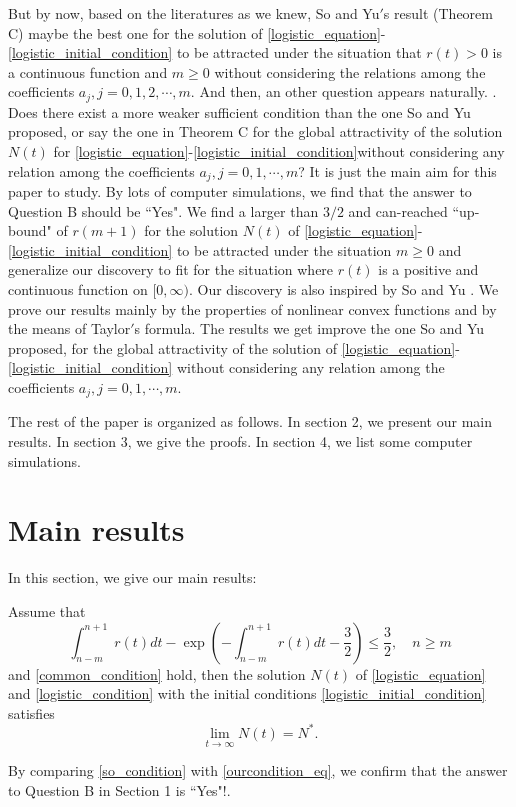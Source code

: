 \documentclass{HZNUMCM}
\begin{document}
But by now, based on the literatures as we knew, So and Yu$'$s result (Theorem C) maybe  the best one for  the solution of \eqref{logistic_equation}-\eqref{logistic_initial_condition} to be attracted under the situation that $r(t)>0$ is a continuous function and $m\geqslant 0$ without considering the relations among the coefficients  $a_j,j=0,1,2,\cdots,m$.  And then, an other question appears naturally.
 \vskip 0.2cm. {Does there exist a more weaker sufficient condition than the one So and Yu  \cite{1995_so_R1339824} proposed, or say the one in  Theorem C for the global attractivity of the solution $N(t)$ for  \eqref{logistic_equation}-\eqref{logistic_initial_condition}without considering any relation among the coefficients $a_j, j=0,1,\cdots,m$?}
 \vskip 0.2cm
It is just the main aim for this paper to study. By lots of computer simulations, we find that the answer to Question B  should be ``Yes".
 We find a larger than $3/2$ and can-reached ``up-bound" of $r(m+1)$ for  the solution $N(t)$ of \eqref{logistic_equation}-\eqref{logistic_initial_condition} to be attracted under the situation $m\geqslant 0$ and generalize our discovery  to fit for the situation where $r(t)$ is a positive and continuous function on $[0,\infty)$.  Our discovery is also inspired by So and Yu \cite{1995_so_R1339824}. We prove our results mainly by the properties of nonlinear convex functions and by the means of Taylor$'$s formula. The results we get improve the one  So and Yu \cite{1995_so_R1339824} proposed, for the global attractivity of the solution of \eqref{logistic_equation}-\eqref{logistic_initial_condition}  without considering any relation among the coefficients $a_j, j=0,1,\cdots,m$.

The rest of the paper is organized  as follows. In section 2, we present our main results. In section 3, we give the proofs. In section 4, we list some computer simulations.

\section{Main results}
In this section, we give our main results:
\begin{theorem}\label{ourcondition}
Assume that
\begin{equation}\label{ourcondition_eq}
\int_{n-m}^{n+1}r(t)dt-\exp\left(-\int_{n-m}^{n+1}r(t)dt-\frac 3 2\right)\leqslant\frac 3 2,\quad n\geqslant m\end{equation}
and \eqref{common_condition} hold, then the solution $N(t)$ of \eqref{logistic_equation} and \eqref{logistic_condition}  with the initial conditions \eqref{logistic_initial_condition} satisfies
$$
\lim_{t\rightarrow\infty}N(t)=N^*.
$$
\end{theorem}
\begin{remark}
By comparing \eqref{so_condition} with \eqref{ourcondition_eq}, we confirm that the answer to Question B in Section 1 is ``Yes"!.
\end{remark}
\end{document}
